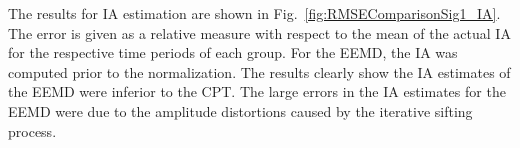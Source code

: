 \documentclass[11pt,draftcls,onecolumn]{IEEEtran}
\begin{document}
The results for IA estimation are shown in Fig.~\ref{fig:RMSEComparisonSig1_IA}. The error is given as a relative measure with respect to the mean of the actual IA for the respective time periods of each group. For the EEMD, the IA was computed prior to the normalization. The results clearly show the IA estimates of the EEMD were inferior to the CPT. The large errors in the IA estimates for the EEMD were due to the amplitude distortions caused by the iterative sifting process.
\begin{figure}[ht]
	\centering

\end{figure}
\end{document}
